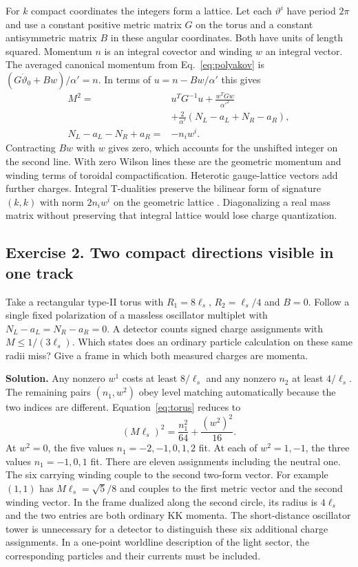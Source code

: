 \documentclass[10pt]{article}
\begin{document}
For $k$ compact coordinates the integers form a lattice. Let each $\vartheta^i$ have period $2\pi$ and use a constant positive metric matrix $G$ on the torus and a constant antisymmetric matrix $B$ in these angular coordinates. Both have units of length squared. Momentum $n$ is an integral covector and winding $w$ an integral vector. The averaged canonical momentum from Eq.~\eqref{eq:polyakov} is $(G\dot\vartheta_0+Bw)/\alpha'=n$. In terms of $u=n-Bw/\alpha'$ this gives
\begin{equation}
\begin{aligned}
 M^2={}&u^TG^{-1}u+\frac{w^TGw}{\alpha'^2}\\
       &+\frac{2}{\alpha'}(N_L-a_L+N_R-a_R),\\
 N_L-a_L-N_R+a_R={}&-n_iw^i .
\end{aligned}
 \label{eq:torus}
\end{equation}
Contracting $Bw$ with $w$ gives zero, which accounts for the unshifted integer on the second line. With zero Wilson lines these are the geometric momentum and winding terms of toroidal compactification. Heterotic gauge-lattice vectors add further charges. Integral T-dualities preserve the bilinear form of signature $(k,k)$ with norm $2n_iw^i$ on the geometric lattice \cite{NSW1987}. Diagonalizing a real mass matrix without preserving that integral lattice would lose charge quantization.

\subsection{Exercise 2. Two compact directions visible in one track}
Take a rectangular type-II torus with $R_1=8\ell_s$, $R_2=\ell_s/4$ and $B=0$. Follow a single fixed polarization of a massless oscillator multiplet with $N_L-a_L=N_R-a_R=0$. A detector counts signed charge assignments with $M\leq1/(3\ell_s)$. Which states does an ordinary particle calculation on these same radii miss? Give a frame in which both measured charges are momenta.

\noindent\textbf{Solution.}
Any nonzero $w^1$ costs at least $8/\ell_s$ and any nonzero $n_2$ at least $4/\ell_s$. The remaining pairs $(n_1,w^2)$ obey level matching automatically because the two indices are different. Equation~\eqref{eq:torus} reduces to
\begin{equation}
 (M\ell_s)^2=\frac{n_1^2}{64}+\frac{(w^2)^2}{16}.
\end{equation}
At $w^2=0$, the five values $n_1=-2,-1,0,1,2$ fit. At each of $w^2=1,-1$, the three values $n_1=-1,0,1$ fit. There are eleven assignments including the neutral one. The six carrying winding couple to the second two-form vector. For example $(1,1)$ has $M\ell_s=\sqrt5/8$ and couples to the first metric vector and the second winding vector. In the frame dualized along the second circle, its radius is $4\ell_s$ and the two entries are both ordinary KK momenta. The short-distance oscillator tower is unnecessary for a detector to distinguish these six additional charge assignments. In a one-point worldline description of the light sector, the corresponding particles and their currents must be included.
\end{document}
